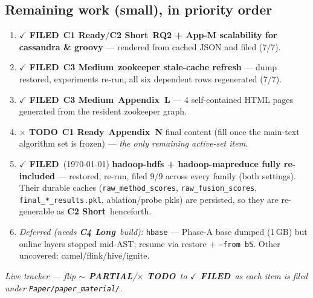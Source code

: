 \documentclass[10pt]{article}
\providecommand{\code}[1]{\texttt{\small #1}}
\newcommand{\Cone}{\textcolor{green!50!black}{\textbf{C1 Ready}}}
\newcommand{\Ctwo}{\textcolor{blue!65!black}{\textbf{C2 Short}}}
\newcommand{\Cthree}{\textcolor{orange!85!black}{\textbf{C3 Medium}}}
\newcommand{\Cfour}{\textcolor{red!75!black}{\textbf{C4 Long}}}
\newcommand{\DONE}{\textcolor{green!45!black}{\textbf{$\checkmark$ FILED}}}
\newcommand{\PARTIAL}{\textcolor{orange!85!black}{\textbf{$\sim$ PARTIAL}}}
\newcommand{\TODO}{\textcolor{red!75!black}{\textbf{$\times$ TODO}}}
\begin{document}
\subsection*{Remaining work (small), in priority order}
\begin{enumerate}[leftmargin=1.6em,itemsep=1pt]
  \item \DONE\ \Cone/\Ctwo\ \textbf{RQ2 + App-M scalability for cassandra \& groovy} ---
  rendered from cached JSON and filed (7/7).
  \item \DONE\ \Cthree\ \textbf{zookeeper stale-cache refresh} --- dump restored,
  experiments re-run, all six dependent rows regenerated (7/7).
  \item \DONE\ \Cthree\ \textbf{Appendix~L} --- 4 self-contained HTML pages generated
  from the resident zookeeper graph.
  \item \TODO\ \Cone\ \textbf{Appendix~N} final content (fill once the main-text
  algorithm set is frozen) --- \emph{the only remaining active-set item}.
  \item \DONE\ (\today) \textbf{hadoop-hdfs + hadoop-mapreduce fully re-included} ---
  restored, re-run, filed 9/9 across every family (both settings). Their durable caches
  (\code{raw\_method\_scores}, \code{raw\_fusion\_scores}, \code{final\_*\_results.pkl},
  ablation/probe pkls) are persisted, so they are re-generable as \Ctwo\ henceforth.
  \item \emph{Deferred (needs \Cfour\ build):} \code{hbase} --- Phase-A base dumped
  (1\,GB) but online layers stopped mid-AST; resume via restore + \code{--from b5}.
  Other uncovered: camel/flink/hive/ignite.
\end{enumerate}

\noindent\emph{Live tracker --- flip \PARTIAL/\TODO\ to \DONE\ as each item is filed
under \code{Paper/paper\_material/}.}
\end{document}
